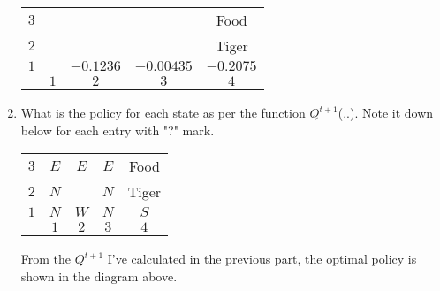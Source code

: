 \begin{enumerate}
\begin{center}
          \bgroup
          \def\arraystretch{1.5}%
          \begin{tabular}{|c|c|c|c|c|}
            \hline
            $3$ &     &                      &            & Food      \\
            $2$ &     & \cellcolor[gray]{.1} &            & Tiger     \\
            $1$ &     & $-0.1236$            & $-0.00435$ & $-0.2075$ \\
            \hline
                & $1$ & $2$                  & $3$        & $4$       \\
            \hline
          \end{tabular}
          \egroup
        \end{center}
        \clearpage
  \item What is the policy for each state as per the function $Q^{t+1}$(..). Note it down below for each entry with "?" mark.
        \begin{center}
          \bgroup
          \def\arraystretch{1.5}%
          \begin{tabular}{|c|c|c|c|c|}
            \hline
            $3$ & $E$ & $E$                  & $E$ & Food  \\
            $2$ & $N$ & \cellcolor[gray]{.1} & $N$ & Tiger \\
            $1$ & $N$ & $W$                  & $N$ & $S$   \\
            \hline
                & $1$ & $2$                  & $3$ & $4$   \\
            \hline
          \end{tabular}
          
          \egroup
        \end{center}
        From the $Q^{t+1}$ I've calculated in the previous part, the optimal policy is shown in the diagram above.
\end{enumerate}